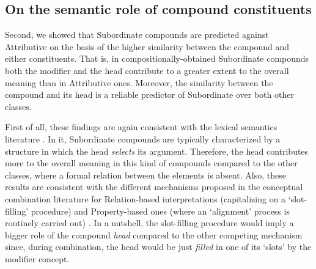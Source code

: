 \documentclass[output=paper]{langsci/langscibook}
\begin{document}
\subsection{On the semantic role of compound constituents}

Second, we showed that Subordinate compounds are predicted against Attributive on the basis of the higher similarity between the compound and either constituents. That is, in compositionally-obtained Subordinate compounds both the modifier and the head contribute to a greater extent to the overall meaning than in Attributive ones. Moreover, the similarity between the compound and its head is a reliable predictor of Subordinate over both other classes.

First of all, these findings are again consistent with the lexical semantics literature \citep{sbg2005,lieber5OHC}. In it, Subordinate compounds are typically characterized by a structure in which the head \emph{selects} its argument. Therefore, the head contributes more to the overall meaning in this kind of compounds compared to the other classes, where a formal relation between the elements is absent. Also, these results are consistent with the different mechanisms proposed in the conceptual combination literature for Relation-based interpretations (capitalizing on a `slot-filling' procedure) and Property-based ones (where an `alignment' process is routinely carried out) \citep{wisniewskigentner,wisniewski1996}. In a nutshell, the slot-filling procedure would imply a bigger role of the compound \emph{head} compared to the other competing mechanism since, during combination, the head would be just \emph{filled} in one of its `slots' by the modifier concept.
\end{document}
